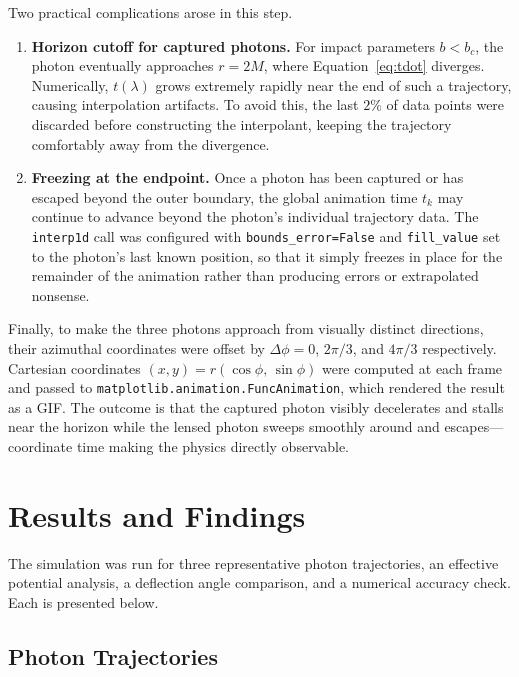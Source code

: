 \documentclass[12pt,a4paper]{article}
\begin{document}
Two practical complications arose in this step.

\begin{enumerate}
    \item \textbf{Horizon cutoff for captured photons.} For impact parameters $b < b_c$, the photon eventually approaches $r = 2M$, where Equation~\eqref{eq:tdot} diverges. Numerically, $t(\lambda)$ grows extremely rapidly near the end of such a trajectory, causing interpolation artifacts. To avoid this, the last $2\%$ of data points were discarded before constructing the interpolant, keeping the trajectory comfortably away from the divergence.

    \item \textbf{Freezing at the endpoint.} Once a photon has been captured or has escaped beyond the outer boundary, the global animation time $t_k$ may continue to advance beyond the photon's individual trajectory data. The \texttt{interp1d} call was configured with \texttt{bounds\_error=False} and \texttt{fill\_value} set to the photon's last known position, so that it simply freezes in place for the remainder of the animation rather than producing errors or extrapolated nonsense.
\end{enumerate}

Finally, to make the three photons approach from visually distinct directions, their azimuthal coordinates were offset by $\Delta\phi = 0$, $2\pi/3$, and $4\pi/3$ respectively. Cartesian coordinates $(x, y) = r(\cos\phi,\, \sin\phi)$ were computed at each frame and passed to \texttt{matplotlib.animation.FuncAnimation}, which rendered the result as a GIF. The outcome is that the captured photon visibly decelerates and stalls near the horizon while the lensed photon sweeps smoothly around and escapes---coordinate time making the physics directly observable.

\section{Results and Findings}

The simulation was run for three representative photon trajectories, an effective potential analysis, a deflection angle comparison, and a numerical accuracy check. Each is presented below.

\subsection{Photon Trajectories}
\end{document}
